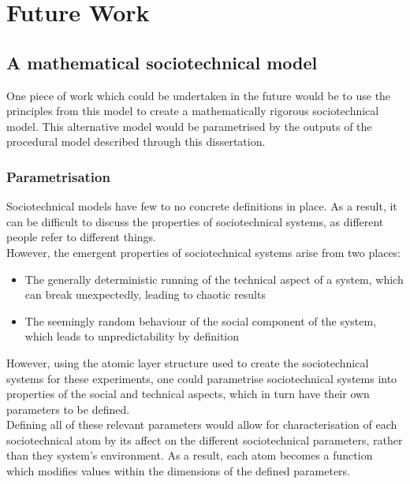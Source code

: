 \chapter{Future Work} %
\label{semantics}
\section{A mathematical sociotechnical model}
One piece of work which could be undertaken in the future would be to use the principles from this model to create a mathematically rigorous sociotechnical model. This alternative model would be parametrised by the outputs of the procedural model described through this dissertation. 
\subsection{Parametrisation}
Sociotechnical models have few to no concrete definitions in place. As a result, it can be difficult to discuss the properties of sociotechnical systems, as different people refer to different things. \\
However, the emergent properties of sociotechnical systems arise from two places:
\begin{itemize}
\item The generally deterministic running of the technical aspect of a system, which can break unexpectedly, leading to chaotic results
\item The seemingly random behaviour of the social component of the system, which leads to unpredictability by definition
\end{itemize}
However, using the atomic layer structure used to create the sociotechnical systems for these experiments, one could parametrise sociotechnical systems into properties of the social and technical aspects, which in turn have their own parameters to be defined.\\
Defining all of these relevant parameters would allow for characterisation of each sociotechnical atom by its affect on the different sociotechnical parameters, rather than they system's environment. As a result, each atom becomes a function which modifies values within the dimensions of the defined parameters. 

